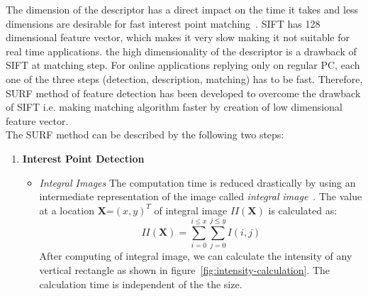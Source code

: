 The dimension of the descriptor has a direct impact on the time it takes and less dimensions are desirable for fast interest point matching~\cite{Bay:08}. SIFT has 128 dimensional feature vector, which makes it very slow making it not suitable for real time applications. the high dimensionality of the descriptor is a drawback of SIFT at matching step. For online applications replying only on regular PC, each one of the three steps (detection, description, matching) has to be fast. Therefore, SURF method of feature detection has been developed to overcome the drawback of SIFT i.e. making matching algorithm faster by creation of low dimensional feature vector. \\

\noindent The SURF method can be described by the following two steps:\\
\begin{enumerate}
	\item \textbf{Interest Point Detection}
	\begin{itemize}
	    \item {\textit{Integral Images}} The computation time is reduced drastically by  using an intermediate representation of the image called \emph{integral image}~\cite{Viola:01}. The value at a location \textbf{X}=$(x,y)^T$ of integral image $II(\textbf{X})$ is calculated as:
	\begin{equation}
	II(\textbf{X})=\sum_{i=0}^{i \leq x}{\sum_{j=0}^{j\leq y}{I(i,j)}}
	\label{eq:integral-image}
	\end{equation}
	After computing of integral image, we can calculate the intensity of any vertical rectangle as shown in figure~\ref{fig:intensity-calculation}. The calculation time is independent of the the size.
	

\end{itemize}
\end{enumerate}
